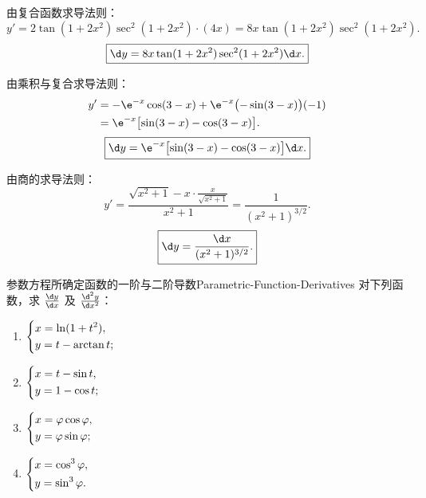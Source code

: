 \begin{solution}

    由复合函数求导法则：
    \begin{equation}
        y' = 2\tan(1 + 2x^2) \sec^2(1 + 2x^2) \cdot (4x) = 8x \tan(1 + 2x^2)\sec^2(1 + 2x^2).
    \end{equation}
    \begin{equation}
        \boxed{\d y = 8x \tan(1 + 2x^2)\sec^2(1 + 2x^2) \d x.}
    \end{equation}


    由乘积与复合求导法则：
    \begin{equation}
        \begin{aligned}
            y' & = -\e^{-x}\cos(3 - x) + \e^{-x}\bigl(-\sin(3 - x)\bigr)(-1) \\
               & = \e^{-x}\bigl[\sin(3 - x) - \cos(3 - x)\bigr].
        \end{aligned}
    \end{equation}
    \begin{equation}
        \boxed{\d y = \e^{-x}\bigl[\sin(3 - x) - \cos(3 - x)\bigr]\d x.}
    \end{equation}


    由商的求导法则：
    \begin{equation}
        y' = \frac{\sqrt{x^2+1} - x \cdot \frac{x}{\sqrt{x^2+1}}}{x^2 + 1} = \frac{1}{(x^2+1)^{3/2}}.
    \end{equation}
    \begin{equation}
        \boxed{\d y = \frac{\d x}{(x^2+1)^{3/2}}.}
    \end{equation}
\end{solution}

\begin{problem}{参数方程所确定函数的一阶与二阶导数}{Parametric-Function-Derivatives}
    对下列函数，求 $\frac{\d y}{\d x}$ 及 $\frac{\d^2 y}{\d x^2}$：
    \begin{enumerate}
        \item $\begin{dcases} x = \ln(1+t^2), \\ y = t - \arctan t; \end{dcases}$
        \item $\begin{dcases} x = t - \sin t, \\ y = 1 - \cos t; \end{dcases}$
        \item $\begin{dcases} x = \varphi \cos \varphi, \\ y = \varphi \sin \varphi; \end{dcases}$
        \item $\begin{dcases} x = \cos^3 \varphi, \\ y = \sin^3 \varphi. \end{dcases}$
    \end{enumerate}
\end{problem}

